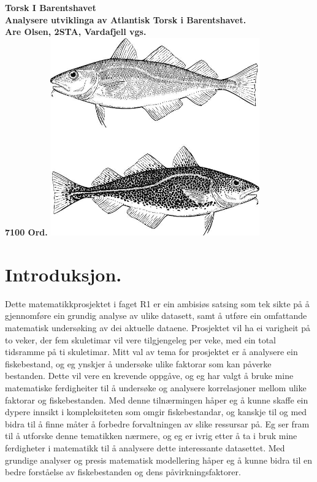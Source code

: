 \documentclass{report}
\begin{document}
\date{\today}
\begin{titlepage}
	\centering
	\vfill
	{\bfseries
		\Huge Torsk I Barentshavet\\ \Large
		Analysere utviklinga av Atlantisk Torsk i Barentshavet.\\
		\vskip2cm
		Are Olsen, 2STA, Vardafjell vgs.\\
		7100 Ord.
	}
	\vfill
	\includegraphics[width=9cm]{Bileter/Torsk.jpg} %
	\vfill
	\vfill
\end{titlepage}

\tableofcontents

\chapter{Introduksjon.}
Dette matematikkprosjektet i faget R1 er ein ambisiøs satsing som tek sikte på å gjennomføre ein grundig analyse av ulike datasett, samt å utføre ein omfattande matematisk undersøking av dei aktuelle dataene. Prosjektet vil ha ei varigheit på to veker, der fem skuletimar vil vere tilgjengeleg per veke, med ein total tidsramme på ti skuletimar.
Mitt val av tema for prosjektet er å analysere ein fiskebestand, og eg ynskjer å undersøke ulike faktorar som kan påverke bestanden. Dette vil vere en krevende oppgåve, og eg har valgt å bruke mine matematiske ferdigheiter til å undersøke og analysere korrelasjoner mellom ulike faktorar og fiskebestanden. Med denne tilnærmingen håper eg å kunne skaffe ein dypere innsikt i kompleksiteten som omgir fiskebestandar, og kanskje til og med bidra til å finne måter å forbedre forvaltningen av slike ressursar på.
Eg ser fram til å utforske denne tematikken nærmere, og eg er ivrig etter å ta i bruk mine ferdigheter i matematikk til å analysere dette interessante datasettet. Med grundige analyser og presis matematisk modellering håper eg å kunne bidra til en bedre forståelse av fiskebestanden og dens påvirkningsfaktorer.
\end{document}
